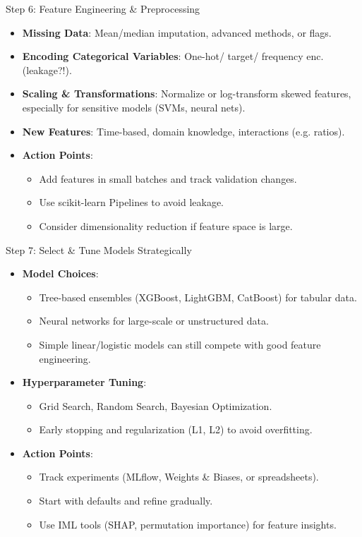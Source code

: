 \documentclass[10pt,compress,t,notes=noshow, xcolor=table]{beamer}
\begin{document}
\begin{frame}{Step 6: Feature Engineering \& Preprocessing}
\begin{itemize}
  \item \textbf{Missing Data}: Mean/median imputation, advanced methods, or flags.
  \item \textbf{Encoding Categorical Variables}: One-hot/ target/ frequency enc. (leakage?!).
  \item \textbf{Scaling \& Transformations}: Normalize or log-transform skewed features, especially for sensitive models (SVMs, neural nets).
  \item \textbf{New Features}: Time-based, domain knowledge, interactions (e.g. ratios).
  \item \textbf{Action Points}:
    \begin{itemize}
      \item Add features in small batches and track validation changes.
      \item Use scikit-learn Pipelines to avoid leakage.
      \item Consider dimensionality reduction if feature space is large.
    \end{itemize}
\end{itemize}
\end{frame}

\begin{frame}{Step 7: Select \& Tune Models Strategically}
\begin{itemize}
  \item \textbf{Model Choices}:
    \begin{itemize}
      \item Tree-based ensembles (XGBoost, LightGBM, CatBoost) for tabular data.
      \item Neural networks for large-scale or unstructured data.
      \item Simple linear/logistic models can still compete with good feature engineering.
    \end{itemize}
  \item \textbf{Hyperparameter Tuning}:
    \begin{itemize}
      \item Grid Search, Random Search, Bayesian Optimization.
      \item Early stopping and regularization (L1, L2) to avoid overfitting.
    \end{itemize}
  \item \textbf{Action Points}:
    \begin{itemize}
      \item Track experiments (MLflow, Weights \& Biases, or spreadsheets).
      \item Start with defaults and refine gradually.
      \item Use IML tools (SHAP, permutation importance) for feature insights.
    \end{itemize}
\end{itemize}
\end{frame}
\end{document}

